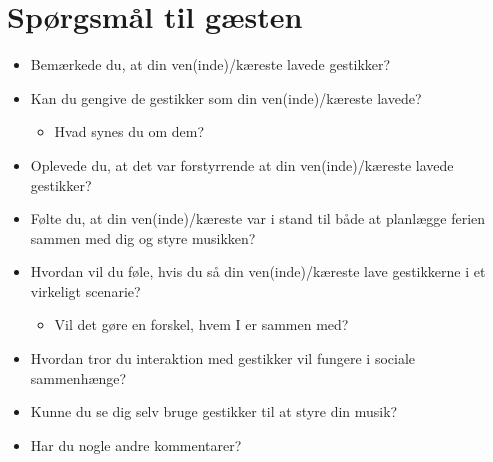 \section{Spørgsmål til gæsten}
\label{app:ExitInterviewGaest}
%
\begin{itemize}
  \item Bemærkede du, at din ven(inde)/kæreste lavede gestikker? 
  \item Kan du gengive de gestikker som din ven(inde)/kæreste lavede?
  \begin{itemize}
  \item Hvad synes du om dem? 
\end{itemize}
  \item Oplevede du, at det var forstyrrende at din ven(inde)/kæreste lavede gestikker? 
  \item Følte du, at din ven(inde)/kæreste var i stand til både at planlægge ferien sammen med dig og styre musikken?
  \item Hvordan vil du føle, hvis du så din ven(inde)/kæreste lave gestikkerne i et virkeligt scenarie?
   \begin{itemize}
  \item Vil det gøre en forskel, hvem I er sammen med?
\end{itemize}
  \item Hvordan tror du interaktion med gestikker vil fungere i sociale sammenhænge? 
  \item Kunne du se dig selv bruge gestikker til at styre din musik?
  \item Har du nogle andre kommentarer?
\end{itemize}



 